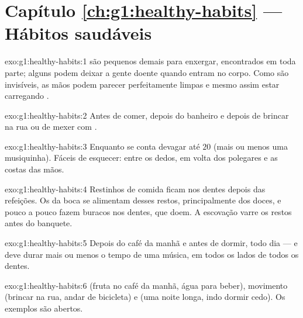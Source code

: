 \section*{Capítulo \ref{ch:g1:healthy-habits} --- Hábitos saudáveis}

\begin{solution}{exo:g1:healthy-habits:1}
 são  pequenos demais para enxergar, encontrados
em toda parte; alguns podem deixar a gente doente quando entram no
corpo. Como são invisíveis, as mãos podem parecer perfeitamente
limpas e mesmo assim estar carregando .
\end{solution}

\begin{solution}{exo:g1:healthy-habits:2}
Antes de comer, depois do banheiro e depois de brincar na rua ou de
mexer com .
\end{solution}

\begin{solution}{exo:g1:healthy-habits:3}
Enquanto se conta devagar até $20$ (mais ou menos uma musiquinha).
Fáceis de esquecer: entre os dedos, em volta dos polegares e as
costas das mãos.
\end{solution}

\begin{solution}{exo:g1:healthy-habits:4}
Restinhos de comida ficam nos dentes depois das refeições. Os
 da boca se alimentam desses restos, principalmente dos
doces, e pouco a pouco fazem buracos nos dentes, que doem. A
escovação varre os restos antes do banquete.
\end{solution}

\begin{solution}{exo:g1:healthy-habits:5}
Depois do café da manhã e antes de dormir, todo dia --- e deve durar
mais ou menos o tempo de uma música, em todos os lados de todos os
dentes.
\end{solution}

\begin{solution}{exo:g1:healthy-habits:6}
 (fruta no café da manhã, água para beber), movimento
(brincar na rua, andar de bicicleta) e  (uma noite longa, indo
dormir cedo). Os exemplos são abertos.
\end{solution}

